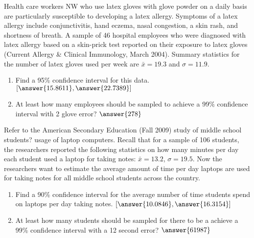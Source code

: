 \documentclass{ximera}
\begin{document}
\begin{problem}
Health care workers NW who use latex gloves with glove powder on a daily basis are particularly susceptible to developing a latex allergy. Symptoms of a latex allergy include conjunctivitis, hand eczema, nasal congestion, a skin rash, and shortness of breath. A sample of 46 hospital employees who were diagnosed with latex allergy based on a skin-prick test reported on their exposure to latex gloves (Current Allergy \& Clinical Immunology, March 2004). Summary statistics for the number of latex gloves used per week are $\bar{x} = 19.3$ and $\sigma = 11.9.$

\begin{enumerate}
\item Find a 95\% confidence interval for this data.  $[\answer{15.8611},\answer{22.7389}]$
\item At least how many employees should be sampled to achieve a 99\% confidence interval with 2 glove error? $\answer{278}$
\end{enumerate}

\end{problem}



\begin{problem}
Refer to the American Secondary Education (Fall 2009) study of middle school students? usage of laptop computers. Recall that for a sample of 106 students, the researchers reported the following statistics on how many minutes per day each student used a laptop for taking notes: $\bar{x} = 13.2$, $\sigma = 19.5$. Now the researchers want to estimate the average amount of time per day laptops are used for taking notes for all middle school students across the country.
\begin{enumerate}
\item Find a 90\% confidence interval for the average number of time students spend on laptops per day taking notes. $[\answer{10.0846}, \answer{16.3154}]$
\item At least how many students should be sampled for there to be a achieve a 99\% confidence interval with a 12 second error? $\answer{61987}$
\end{enumerate}


\end{problem}
\end{document}
